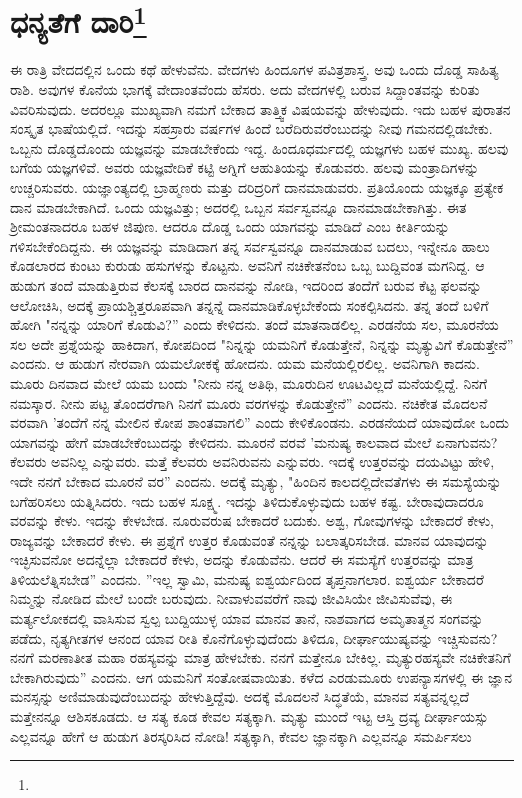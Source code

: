 
\chapter[ಧನ್ಯತೆಗೆ ದಾರಿ]{ಧನ್ಯತೆಗೆ ದಾರಿ\protect\footnote{}}

ಈ ರಾತ್ರಿ ವೇದದಲ್ಲಿನ ಒಂದು ಕಥೆ ಹೇಳುವೆನು. ವೇದಗಳು ಹಿಂದೂಗಳ ಪವಿತ್ರಶಾಸ್ತ್ರ. ಅವು ಒಂದು ದೊಡ್ಡ ಸಾಹಿತ್ಯ ರಾಶಿ. ಅವುಗಳ ಕೊನೆಯ ಭಾಗಕ್ಕೆ ವೇದಾಂತವೆಂದು ಹೆಸರು. ಅದು ವೇದಗಳಲ್ಲಿ ಬರುವ ಸಿದ್ದಾಂತವನ್ನು ಕುರಿತು ವಿವರಿಸುವುದು. ಅದರಲ್ಲೂ ಮುಖ್ಯವಾಗಿ ನಮಗೆ ಬೇಕಾದ ತಾತ್ತ್ವಿಕ ವಿಷಯವನ್ನು ಹೇಳುವುದು. ಇದು ಬಹಳ ಪುರಾತನ ಸಂಸ್ಕೃತ ಭಾಷೆಯಲ್ಲಿದೆ. ಇದನ್ನು ಸಹಸ್ರಾರು ವರ್ಷಗಳ ಹಿಂದೆ ಬರೆದಿರುವರೆಂಬುದನ್ನು ನೀವು ಗಮನದಲ್ಲಿಡಬೇಕು. ಒಬ್ಬನು ದೊಡ್ಡದೊಂದು ಯಜ್ಞವನ್ನು ಮಾಡಬೇಕೆಂದು ಇದ್ದ. ಹಿಂದೂಧರ್ಮದಲ್ಲಿ ಯಜ್ಞಗಳು ಬಹಳ ಮುಖ್ಯ. ಹಲವು ಬಗೆಯ ಯಜ್ಞಗಳಿವೆ. ಅವರು ಯಜ್ಞವೇದಿಕೆ ಕಟ್ಟಿ ಅಗ್ನಿಗೆ ಆಹುತಿಯನ್ನು ಕೊಡುವರು. ಹಲವು ಮಂತ್ರಾದಿಗಳನ್ನು ಉಚ್ಚರಿಸುವರು. ಯಜ್ಞಾಂತ್ಯದಲ್ಲಿ ಬ್ರಾಹ್ಮಣರು ಮತ್ತು ದರಿದ್ರರಿಗೆ ದಾನಮಾಡುವರು. ಪ್ರತಿಯೊಂದು ಯಜ್ಞಕ್ಕೂ ಪ್ರತ್ಯೇಕ ದಾನ ಮಾಡಬೇಕಾಗಿದೆ. ಒಂದು ಯಜ್ಞವಿತ್ತು; ಅದರಲ್ಲಿ ಒಬ್ಬನ ಸರ್ವಸ್ವವನ್ನೂ ದಾನಮಾಡಬೇಕಾಗಿತ್ತು. ಈತ ಶ‍್ರೀಮಂತನಾದರೂ ಬಹಳ ಜಿಪುಣ. ಆದರೂ ದೊಡ್ಡ ಒಂದು ಯಾಗವನ್ನು ಮಾಡಿದೆ ಎಂಬ ಕೀರ್ತಿಯನ್ನು ಗಳಿಸಬೇಕೆಂದಿದ್ದನು. ಈ ಯಜ್ಞವನ್ನು ಮಾಡಿದಾಗ ತನ್ನ ಸರ್ವಸ್ವವನ್ನೂ ದಾನಮಾಡುವ ಬದಲು, ಇನ್ನೇನೂ ಹಾಲು ಕೊಡಲಾರದ ಕುಂಟು ಕುರುಡು ಹಸುಗಳನ್ನು ಕೊಟ್ಟನು. ಅವನಿಗೆ ನಚಿಕೇತನೆಂಬ ಒಬ್ಬ ಬುದ್ದಿವಂತ ಮಗನಿದ್ದ. ಆ ಹುಡುಗ ತಂದೆ ಮಾಡುತ್ತಿರುವ ಕೆಲಸಕ್ಕೆ ಬಾರದ ದಾನವನ್ನು ನೋಡಿ, ಇದರಿಂದ ತಂದೆಗೆ ಬರುವ ಕೆಟ್ಟ ಫಲವನ್ನು ಆಲೋಚಿಸಿ, ಅದಕ್ಕೆ ಪ್ರಾಯಶ್ಚಿತ್ತರೂಪವಾಗಿ ತನ್ನನ್ನೆ ದಾನಮಾಡಿಕೊಳ್ಳಬೇಕೆಂದು ಸಂಕಲ್ಪಿಸಿದನು. ತನ್ನ ತಂದೆ ಬಳಿಗೆ ಹೋಗಿ "ನನ್ನನ್ನು ಯಾರಿಗೆ ಕೊಡುವಿ?'' ಎಂದು ಕೇಳಿದನು. ತಂದೆ ಮಾತನಾಡಲಿಲ್ಲ. ಎರಡನೆಯ ಸಲ, ಮೂರನೆಯ ಸಲ ಅದೇ ಪ್ರಶ್ನೆಯನ್ನು ಹಾಕಿದಾಗ, ಕೋಪದಿಂದ "ನಿನ್ನನ್ನು ಯಮನಿಗೆ ಕೊಡುತ್ತೇನೆ, ನಿನ್ನನ್ನು ಮೃತ್ಯುವಿಗೆ ಕೊಡುತ್ತೇನೆ'' ಎಂದನು. ಆ ಹುಡುಗ ನೇರವಾಗಿ ಯಮಲೋಕಕ್ಕೆ ಹೋದನು. ಯಮ ಮನೆಯಲ್ಲಿರಲಿಲ್ಲ. ಅವನಿಗಾಗಿ ಕಾದನು. ಮೂರು ದಿನವಾದ ಮೇಲೆ ಯಮ ಬಂದು "ನೀನು ನನ್ನ ಅತಿಥಿ, ಮೂರುದಿನ ಊಟವಿಲ್ಲದೆ ಮನೆಯಲ್ಲಿದ್ದೆ. ನಿನಗೆ ನಮಸ್ಕಾರ. ನೀನು ಪಟ್ಟ ತೊಂದರೆಗಾಗಿ ನಿನಗೆ ಮೂರು ವರಗಳನ್ನು ಕೊಡುತ್ತೇನೆ” ಎಂದನು. ನಚಿಕೇತ ಮೊದಲನೆ ವರವಾಗಿ 'ತಂದೆಗೆ ನನ್ನ ಮೇಲಿನ ಕೋಪ ಶಾಂತವಾಗಲಿ'' ಎಂದು ಕೇಳಿಕೊಂಡನು. ಎರಡನೆಯದೆ ಯಾವುದೋ ಒಂದು ಯಾಗವನ್ನು ಹೇಗೆ ಮಾಡಬೇಕೆಂಬುದನ್ನು ಕೇಳಿದನು. ಮೂರನೆ ವರವೆ 'ಮನುಷ್ಯ ಕಾಲವಾದ ಮೇಲೆ ಏನಾಗುವನು? ಕೆಲವರು ಅವನಿಲ್ಲ ಎನ್ನುವರು. ಮತ್ತೆ ಕೆಲವರು ಅವನಿರುವನು ಎನ್ನುವರು. ಇದಕ್ಕೆ ಉತ್ತರವನ್ನು ದಯವಿಟ್ಟು ಹೇಳಿ, ಇದೇ ನನಗೆ ಬೇಕಾದ ಮೂರನೆ ವರ'' ಎಂದನು. ಅದಕ್ಕೆ ಮೃತ್ಯು, "ಹಿಂದಿನ ಕಾಲದಲ್ಲಿ\break ದೇವತೆಗಳು ಈ ಸಮಸ್ಯೆಯನ್ನು ಬಗೆಹರಿಸಲು ಯತ್ನಿಸಿದರು. ಇದು ಬಹಳ ಸೂಕ್ಷ್ಮ. ಇದನ್ನು ತಿಳಿದುಕೊಳ್ಳುವುದು ಬಹಳ ಕಷ್ಟ. ಬೇರಾವುದಾದರೂ ವರವನ್ನು ಕೇಳು. ಇದನ್ನು ಕೇಳಬೇಡ. ನೂರುವರುಷ ಬೇಕಾದರೆ ಬದುಕು. ಅಶ್ವ, ಗೋವುಗಳನ್ನು ಬೇಕಾದರೆ ಕೇಳು, ರಾಜ್ಯವನ್ನು ಬೇಕಾದರೆ ಕೇಳು. ಈ ಪ್ರಶ್ನೆಗೆ ಉತ್ತರ ಕೊಡುವಂತೆ ನನ್ನನ್ನು ಬಲಾತ್ಕರಿಸಬೇಡ. ಮಾನವ ಯಾವುದನ್ನು ಇಚ್ಛಿಸುವನೋ ಅದನ್ನೆಲ್ಲಾ ಬೇಕಾದರೆ ಕೇಳು, ಅದನ್ನು ಕೊಡುವೆನು. ಆದರೆ ಈ ಸಮಸ್ಯೆಗೆ ಉತ್ತರವನ್ನು ಮಾತ್ರ ತಿಳಿಯಲೆತ್ನಿಸಬೇಡ'' ಎಂದನು. ''ಇಲ್ಲ ಸ್ವಾಮಿ, ಮನುಷ್ಯ ಐಶ್ವರ್ಯದಿಂದ ತೃಪ್ತನಾಗಲಾರ. ಐಶ್ವರ್ಯ ಬೇಕಾದರೆ ನಿಮ್ಮನ್ನು ನೋಡಿದ ಮೇಲೆ ಬಂದೇ ಬರುವುದು. ನೀವಾಳುವವರೆಗೆ ನಾವು ಜೀವಿಸಿಯೇ ಜೀವಿಸುವೆವು, ಈ ಮರ್ತ್ಯಲೋಕದಲ್ಲಿ ವಾಸಿಸುವ ಸ್ವಲ್ಪ ಬುದ್ದಿಯುಳ್ಳ ಯಾವ ಮಾನವ ತಾನೆ, ನಾಶವಾಗದ ಅಮೃತಾತ್ಮನ ಸಂಗವನ್ನು ಪಡೆದು, ನೃತ್ಯಗೀತಗಳ ಆನಂದ ಯಾವ ರೀತಿ ಕೊನೆಗೊಳ್ಳುವುದೆಂದು ತಿಳಿದೂ, ದೀರ್ಘಾಯುಷ್ಯವನ್ನು ಇಚ್ಚಿಸುವನು? ನನಗೆ ಮರಣಾತೀತ ಮಹಾ ರಹಸ್ಯವನ್ನು ಮಾತ್ರ ಹೇಳಬೇಕು. ನನಗೆ ಮತ್ತೇನೂ ಬೇಕಿಲ್ಲ. ಮೃತ್ಯುರಹಸ್ಯವೇ ನಚಿಕೇತನಿಗೆ ಬೇಕಾಗಿರುವುದು” ಎಂದನು. ಆಗ ಯಮನಿಗೆ ಸಂತೋಷವಾಯಿತು. ಕಳೆದ ಎರಡುಮೂರು ಉಪನ್ಯಾಸಗಳಲ್ಲಿ ಈ ಜ್ಞಾನ ಮನಸ್ಸನ್ನು ಅಣಿಮಾಡುವುದೆಂಬುದನ್ನು ಹೇಳುತ್ತಿದ್ದೆವು. ಅದಕ್ಕೆ ಮೊದಲನೆ ಸಿದ್ಧತೆಯೆ, ಮಾನವ ಸತ್ಯವನ್ನಲ್ಲದೆ ಮತ್ತೇನನ್ನೂ ಆಶಿಸಕೂಡದು. ಆ ಸತ್ಯ ಕೂಡ ಕೇವಲ ಸತ್ಯಕ್ಕಾಗಿ. ಮೃತ್ಯು ಮುಂದೆ ಇಟ್ಟ ಆಸ್ತಿ ದ್ರವ್ಯ ದೀರ್ಘಾಯಸ್ಸು ಎಲ್ಲವನ್ನೂ ಹೇಗೆ ಆ ಹುಡುಗ ತಿರಸ್ಕರಿಸಿದ ನೋಡಿ! ಸತ್ಯಕ್ಕಾಗಿ, ಕೇವಲ ಜ್ಞಾನಕ್ಕಾಗಿ ಎಲ್ಲವನ್ನೂ ಸಮರ್ಪಿಸಲು 